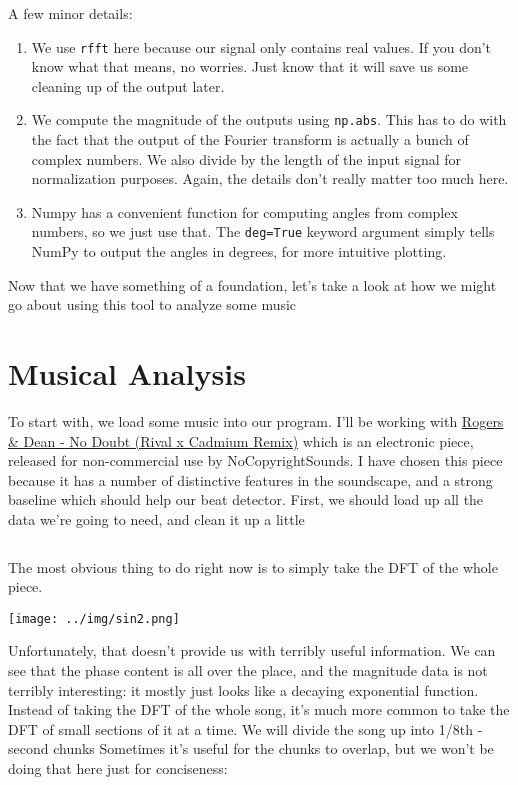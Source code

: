 \documentclass[12pt]{article}
\begin{document}
A few minor details:
\begin{enumerate}
\item We use \texttt{rfft} here because our signal only contains real values.
  If you don't know what that means, no worries.
  Just know that it will save us some cleaning up of the output later.
\item We compute the magnitude of the outputs using \texttt{np.abs}.
  This has to do with the fact that the output of the Fourier transform
  is actually a bunch of complex numbers.
  We also divide by the length of the input signal for normalization purposes.
  Again, the details don't really matter too much here.
\item Numpy has a convenient function for computing angles from complex numbers,
  so we just use that.
  The \texttt{deg=True} keyword argument simply
  tells NumPy to output the angles in degrees,
  for more intuitive plotting.
\end{enumerate}

Now that we have something of a foundation,
let's take a look at how we might go about using this tool to analyze some music

\section{Musical Analysis}
To start with, we load some music into our program.
I'll be working with
\href{https://www.youtube.com/watch?v=Hwl8d5Fp-Jk}{Rogers \& Dean - No Doubt (Rival x Cadmium Remix)}
which is an electronic piece,
released for non-commercial use by NoCopyrightSounds.
I have chosen this piece because
it has a number of distinctive features in the soundscape,
and a strong baseline which should help our beat detector.
First, we should load up all the data we're going to need,
and clean it up a little

\inputminted[firstline=1,lastline=10]{python}{../data.py}

The most obvious thing to do right now is to simply take the DFT
of the whole piece.

\texttt{[image: ../img/sin2.png]}

Unfortunately, that doesn't provide us with terribly useful information.
We can see that the phase content is all over the place,
and the magnitude data is not terribly interesting:
it mostly just looks like a decaying exponential function.
Instead of taking the DFT of the whole song, it's much more
common to take the DFT of small sections of it at a time.
We will divide the song up into 1/8th - second chunks
Sometimes it's useful for the chunks to overlap,
but we won't be doing that here just for conciseness:
\end{document}
